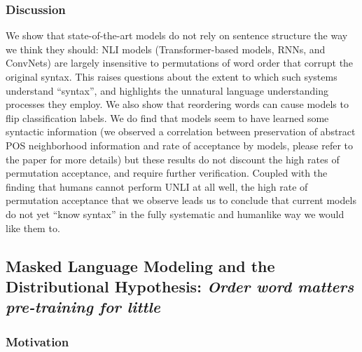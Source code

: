 \documentclass[12pt]{article}
\begin{document}
\subsubsection{Discussion}

We show that state-of-the-art models do not rely on sentence structure the way we think they should: NLI models (Transformer-based models, RNNs, and ConvNets) are largely insensitive to permutations of word order that corrupt the original syntax. This raises questions about the extent to which such systems understand ``syntax'', and highlights the unnatural language understanding processes they employ.
We also show that reordering words can cause models to flip classification labels. %
We do find that models seem to have learned some syntactic information (we observed a correlation between preservation of abstract POS neighborhood information and rate of acceptance by models, please refer to the paper \cite{sinha2021} for more details) but these results do not discount the high rates of permutation acceptance, and require further verification. Coupled with the finding that humans cannot perform UNLI at all well, the high rate of permutation acceptance that we observe leads us to conclude that current models do not yet ``know syntax'' in the fully systematic and humanlike way we would like them to.


\subsection{Masked Language Modeling and the Distributional Hypothesis: \textit{Order word matters pre-training for little}}

\subsubsection{Motivation}
\end{document}
